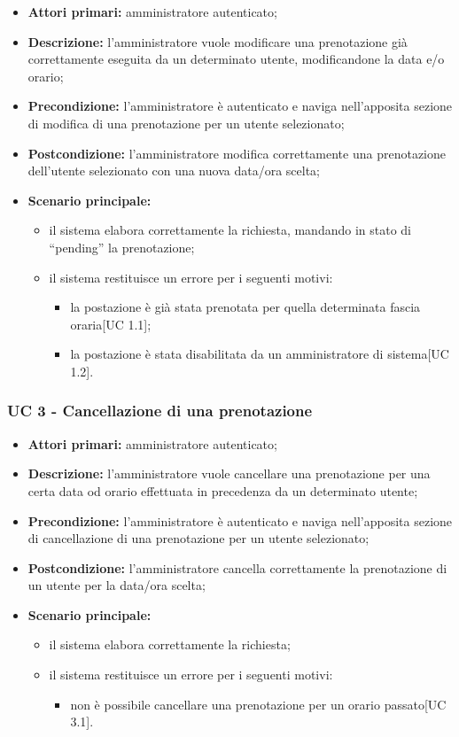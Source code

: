 \begin{itemize}
\item \textbf{Attori primari:} amministratore autenticato;
\item \textbf{Descrizione:} l'amministratore vuole modificare una prenotazione già correttamente eseguita da un determinato utente, modificandone la data e/o orario;
\item \textbf{Precondizione:} l'amministratore è autenticato e naviga nell’apposita sezione di modifica di una prenotazione per un utente selezionato;
\item \textbf{Postcondizione:} l'amministratore modifica correttamente una prenotazione dell'utente selezionato con una nuova data/ora scelta;
\item \textbf{Scenario principale:} 
	\begin{itemize}
		\item il sistema elabora correttamente la richiesta, mandando in stato di “pending” la prenotazione;
		\item il sistema restituisce un errore per i seguenti motivi:
		\begin{itemize}
			\item la postazione è già stata prenotata per quella determinata fascia oraria[UC 1.1];
			\item la postazione è stata disabilitata da un amministratore di sistema[UC 1.2].	
		\end{itemize}
	\end{itemize}
\end{itemize}

\subsubsection{UC 3 - Cancellazione di una prenotazione}

\begin{itemize}
\item \textbf{Attori primari:} amministratore autenticato;
\item \textbf{Descrizione:} l'amministratore vuole cancellare una prenotazione per una certa data od orario effettuata in precedenza da un determinato utente;
\item \textbf{Precondizione:} l'amministratore è autenticato e naviga nell’apposita sezione di cancellazione di una prenotazione per un utente selezionato;
\item \textbf{Postcondizione:} l'amministratore cancella correttamente la prenotazione di un utente per la data/ora scelta;
\item \textbf{Scenario principale:} 
	\begin{itemize}
		\item il sistema elabora correttamente la richiesta;
		\item il sistema restituisce un errore per i seguenti motivi:
		\begin{itemize}
			\item non è possibile cancellare una prenotazione per un orario passato[UC 3.1].
		\end{itemize}
	\end{itemize}
\end{itemize}

